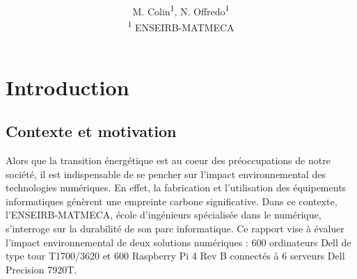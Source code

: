 \documentclass[12pt,a4paper]{paper}
\title{\textbf{\Title}}
\author{M. Colin\textsuperscript{1}, N. Offredo\textsuperscript{1}\\[6pt]
\textsuperscript{1} ENSEIRB-MATMECA\\
}
\newcommand{\Title}{Analyse du cycle de vie du parc informatique de l’ENSEIRB-MATMECA}
\newcommand{\Course}{Développement durable et responsabilité sociétale
\\ Département Informatique
\\ S6 - Année 2024/2025}
\newcommand{\Author}{Mélissa Colin - Noé Offredo}
\newcommand{\Date}{\today}
\begin{document}

\maketitle






\section{Introduction}
\subsection{Contexte et motivation}
Alors que la transition énergétique est au coeur des préoccupations de notre société, il est indispensable de se pencher sur l'impact environnemental des technologies numériques. En effet, la fabrication et l'utilisation des équipements informatiques génèrent une empreinte carbone significative. Dans ce contexte, l'ENSEIRB-MATMECA, école d'ingénieurs spécialisée dans le numérique, s'interroge sur la durabilité de son parc informatique. Ce rapport vise à évaluer l'impact environnemental de deux solutions numériques : 600 ordinateurs Dell de type tour T1700/3620 et 600 Raspberry Pi 4 Rev B connectés à 6 serveurs Dell Precision 7920T.
\end{document}
